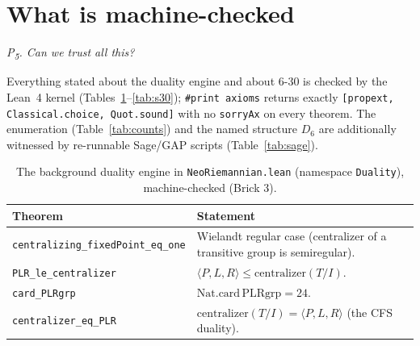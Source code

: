 \documentclass[11pt]{article}
\newcommand{\lean}[1]{\texttt{#1}}
\newcommand{\Dgrp}[1]{D_{#1}}
\newcommand{\question}[1]{\smallskip\noindent\textit{#1}\smallskip}
\begin{document}
\section{What is machine-checked}\label{sec:checked}

\question{P\textsubscript{5}. Can we trust all this?}

Everything stated about the duality engine and about 6-30 is checked by the Lean~4 kernel
(Tables~\ref{tab:lean}--\ref{tab:s30}); \lean{\#print axioms} returns exactly
\lean{[propext, Classical.choice, Quot.sound]} with no \lean{sorryAx} on every theorem. The enumeration
(Table~\ref{tab:counts}) and the named structure $\Dgrp{6}$ are additionally witnessed by re-runnable
Sage/GAP scripts (Table~\ref{tab:sage}).

\begin{table}[h]
\centering\small
{}
\begin{tabular}{@{}l p{}@{}}
\toprule
\rowcolor{ctA!22}
\textbf{Theorem} & \textbf{Statement}\\
\midrule
\lean{centralizing\_fixedPoint\_eq\_one} & Wielandt regular case (centralizer of a transitive group is semiregular).\\
\lean{PLR\_le\_centralizer}              & $\langle P,L,R\rangle\le\mathrm{centralizer}(T/I)$.\\
\lean{card\_PLRgrp}                      & $\mathrm{Nat.card}\,\mathrm{PLRgrp}=24$.\\
\lean{centralizer\_eq\_PLR}             & $\mathrm{centralizer}(T/I)=\langle P,L,R\rangle$ (the CFS duality).\\
\bottomrule
\end{tabular}
\caption{The background duality engine in \lean{NeoRiemannian.lean} (namespace \lean{Duality}),
machine-checked (Brick 3).}
\label{tab:lean}
\end{table}
\end{document}
